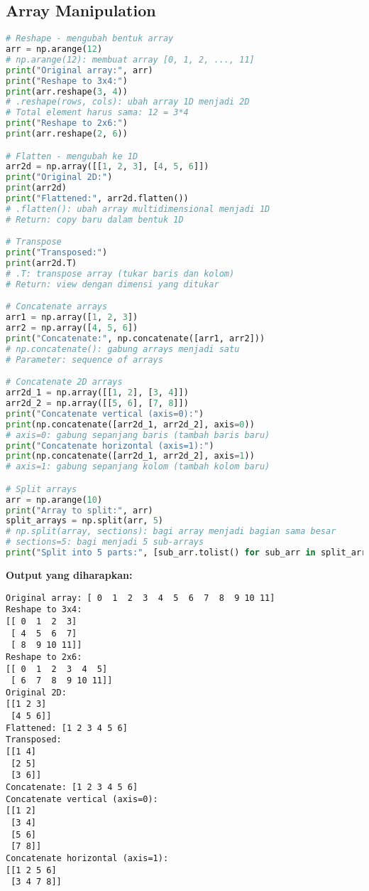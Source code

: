 \subsection*{Array Manipulation}

\begin{lstlisting}[language=python, caption={Manipulasi Bentuk dan Struktur Array}, style=python]
# Reshape - mengubah bentuk array
arr = np.arange(12)
# np.arange(12): membuat array [0, 1, 2, ..., 11]
print("Original array:", arr)
print("Reshape to 3x4:")
print(arr.reshape(3, 4))
# .reshape(rows, cols): ubah array 1D menjadi 2D
# Total element harus sama: 12 = 3*4
print("Reshape to 2x6:")
print(arr.reshape(2, 6))

# Flatten - mengubah ke 1D
arr2d = np.array([[1, 2, 3], [4, 5, 6]])
print("Original 2D:")
print(arr2d)
print("Flattened:", arr2d.flatten())
# .flatten(): ubah array multidimensional menjadi 1D
# Return: copy baru dalam bentuk 1D

# Transpose
print("Transposed:")
print(arr2d.T)
# .T: transpose array (tukar baris dan kolom)
# Return: view dengan dimensi yang ditukar

# Concatenate arrays
arr1 = np.array([1, 2, 3])
arr2 = np.array([4, 5, 6])
print("Concatenate:", np.concatenate([arr1, arr2]))
# np.concatenate(): gabung arrays menjadi satu
# Parameter: sequence of arrays

# Concatenate 2D arrays
arr2d_1 = np.array([[1, 2], [3, 4]])
arr2d_2 = np.array([[5, 6], [7, 8]])
print("Concatenate vertical (axis=0):")
print(np.concatenate([arr2d_1, arr2d_2], axis=0))
# axis=0: gabung sepanjang baris (tambah baris baru)
print("Concatenate horizontal (axis=1):")
print(np.concatenate([arr2d_1, arr2d_2], axis=1))
# axis=1: gabung sepanjang kolom (tambah kolom baru)

# Split arrays
arr = np.arange(10)
print("Array to split:", arr)
split_arrays = np.split(arr, 5)
# np.split(array, sections): bagi array menjadi bagian sama besar
# sections=5: bagi menjadi 5 sub-arrays
print("Split into 5 parts:", [sub_arr.tolist() for sub_arr in split_arrays])
\end{lstlisting}

\textbf{Output yang diharapkan:}
\begin{lstlisting}[style=bash]
Original array: [ 0  1  2  3  4  5  6  7  8  9 10 11]
Reshape to 3x4:
[[ 0  1  2  3]
 [ 4  5  6  7]
 [ 8  9 10 11]]
Reshape to 2x6:
[[ 0  1  2  3  4  5]
 [ 6  7  8  9 10 11]]
Original 2D:
[[1 2 3]
 [4 5 6]]
Flattened: [1 2 3 4 5 6]
Transposed:
[[1 4]
 [2 5]
 [3 6]]
Concatenate: [1 2 3 4 5 6]
Concatenate vertical (axis=0):
[[1 2]
 [3 4]
 [5 6]
 [7 8]]
Concatenate horizontal (axis=1):
[[1 2 5 6]
 [3 4 7 8]]
\end{lstlisting}

